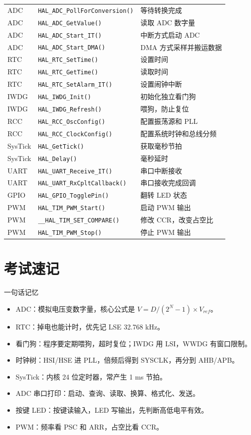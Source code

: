 \documentclass[UTF8,fontset=none,12pt]{ctexart}
\newcommand{\api}[1]{{\footnotesize\nolinkurl{#1}}}
\begin{document}
\begin{center}
\begin{longtable}{@{}p{2.4cm}p{5.5cm}p{7.5cm}@{}}
ADC & \api{HAL_ADC_PollForConversion()} & 等待转换完成 \\
ADC & \api{HAL_ADC_GetValue()} & 读取 ADC 数字量 \\
ADC & \api{HAL_ADC_Start_IT()} & 中断方式启动 ADC \\
ADC & \api{HAL_ADC_Start_DMA()} & DMA 方式采样并搬运数据 \\
RTC & \api{HAL_RTC_SetTime()} & 设置时间 \\
RTC & \api{HAL_RTC_GetTime()} & 读取时间 \\
RTC & \api{HAL_RTC_SetAlarm_IT()} & 设置闹钟中断 \\
IWDG & \api{HAL_IWDG_Init()} & 初始化独立看门狗 \\
IWDG & \api{HAL_IWDG_Refresh()} & 喂狗，防止复位 \\
RCC & \api{HAL_RCC_OscConfig()} & 配置振荡源和 PLL \\
RCC & \api{HAL_RCC_ClockConfig()} & 配置系统时钟和总线分频 \\
SysTick & \api{HAL_GetTick()} & 获取毫秒节拍 \\
SysTick & \api{HAL_Delay()} & 毫秒延时 \\
UART & \api{HAL_UART_Receive_IT()} & 串口中断接收 \\
UART & \api{HAL_UART_RxCpltCallback()} & 串口接收完成回调 \\
GPIO & \api{HAL_GPIO_TogglePin()} & 翻转 LED 状态 \\
PWM & \api{HAL_TIM_PWM_Start()} & 启动 PWM 输出 \\
PWM & \api{__HAL_TIM_SET_COMPARE()} & 修改 CCR，改变占空比 \\
PWM & \api{HAL_TIM_PWM_Stop()} & 停止 PWM 输出 \\
\bottomrule
\end{longtable}
\end{center}

\section{考试速记}
\begin{summarybox}{一句话记忆}
\begin{itemize}
  \item ADC：模拟电压变数字量，核心公式是 $V=D/(2^N-1)\times V_{ref}$。
  \item RTC：掉电也能计时，优先记 LSE 32.768 kHz。
  \item 看门狗：程序要定期喂狗，超时复位；IWDG 用 LSI，WWDG 有窗口限制。
  \item 时钟树：HSI/HSE 进 PLL，倍频后得到 SYSCLK，再分到 AHB/APB。
  \item SysTick：内核 24 位定时器，常产生 1 ms 节拍。
  \item ADC 串口打印：启动、查询、读取、换算、格式化、发送。
  \item 按键 LED：按键读输入，LED 写输出，先判断高低电平有效。
  \item PWM：频率看 PSC 和 ARR，占空比看 CCR。
\end{itemize}
\end{summarybox}
\end{document}
